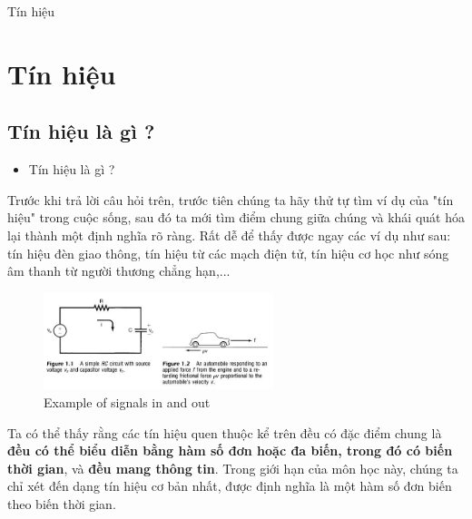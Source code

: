 \documentclass[8pt]{beamer}
\begin{document}
\begin{frame}{Tín hiệu}
	\section{Tín hiệu}
\subsection{Tín hiệu là gì ?}
\begin{itemize}
	\item Tín hiệu là gì ?
\end{itemize}
Trước khi trả lời câu hỏi trên, trước tiên chúng ta hãy thử tự tìm ví dụ của "tín hiệu" trong cuộc sống, sau đó ta mới tìm điểm chung giữa chúng và khái quát hóa lại thành một định nghĩa rõ ràng. Rất dễ để thấy được ngay các ví dụ như sau: tín hiệu đèn giao thông, tín hiệu từ các mạch điện tử, tín hiệu cơ học như sóng âm thanh từ người thương chẳng hạn,... 
\begin{figure}[h]
			\includegraphics[width=0.6\textwidth]{signal.jpg}
			\caption{Example of signals in and out}			\label{fig:re1}
		\end{figure}
	Ta có thể thấy rằng các tín hiệu quen thuộc kể trên đều có đặc điểm chung là \textbf{đều có thể biểu diễn bằng hàm số đơn hoặc đa biến, trong đó có biến thời gian}, và \textbf{đều mang thông tin}. Trong giới hạn của môn học này, chúng ta chỉ xét đến dạng tín hiệu cơ bản nhất, được định nghĩa là \alert{một hàm số đơn biến theo biến thời gian}.
\end{frame}
\end{document}
